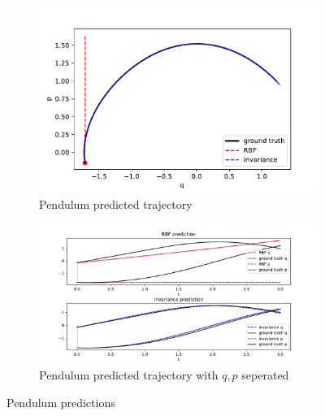 \documentclass{statsmsc}
\begin{document}
\begin{figure}[H]
     \centering
     \begin{subfigure}[b]{\linewidth}
        \centering
        \includegraphics[width=\linewidth]{../codes/figures/pendulum_predicted_trajectory.pdf}
        \caption{Pendulum predicted trajectory}
        \label{fig:pendulum_prediction_combined}
     \end{subfigure}
     \hfill
     \begin{subfigure}[b]{\linewidth}
         \centering
         \includegraphics[width=\linewidth]{../codes/figures/pendulum_predicted_trajectory_seperate.pdf}
         \caption{ Pendulum predicted trajectory with $q, p$ seperated}
         \label{fig:pendulum_prediction_seperate}
     \end{subfigure}
        \caption{Pendulum predictions}
        \label{fig:pendulum_prediction}
\end{figure}
\end{document}
